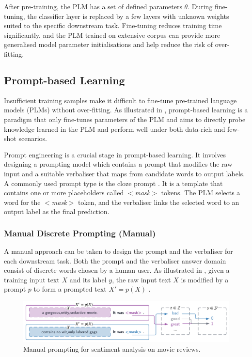 After pre-training, the PLM has a set of defined parameters $\theta$. During fine-tuning, the classifier layer is replaced by a few layers with unknown weights suited to the specific downstream task. Fine-tuning reduces training time significantly, and the PLM trained on extensive corpus can provide more generalised model parameter initialisations and help reduce the risk of over-fitting.

\subsection{Prompt-based Learning}
Insufficient training samples make it difficult to fine-tune pre-trained language models (PLMs) without over-fitting. As illustrated in , prompt-based learning is a paradigm that only fine-tunes parameters of the PLM and aims to directly probe knowledge learned in the PLM and perform well under both data-rich and few-shot scenarios.

Prompt engineering is a crucial stage in prompt-based learning. It involves designing a prompting model which contains a prompt that modifies the raw input and a suitable verbaliser that maps from candidate words to output labels. A commonly used prompt type is the cloze prompt \cite{Petroni19Cloze, Cui21Cloze}. It is a template that contains one or more placeholders called $<$\textit{mask}$>$ tokens. The PLM selects a word for the $<$\textit{mask}$>$ token, and the verbaliser links the selected word to an output label as the final prediction.

\subsubsection{Manual Discrete Prompting (Manual)}
A manual approach can be taken to design the prompt and the verbaliser for each downstream task. Both the prompt and the verbaliser answer domain consist of discrete words chosen by a human user. As illustrated in , given a training input text $X$ and its label $y$, the raw input text $X$ is modified by a prompt $p$ to form a prompted text $X' = p(X)$ \cite{Liu21}. 

\vspace{-0.5em}
\begin{figure}[!ht]
    \centering
    \includegraphics[width=\hsize]{figures/preparation_media/prepare-manual.pdf}
    \caption{Manual prompting for sentiment analysis on movie reviews.}
    \label{fig:prepare-manual}
\end{figure}

